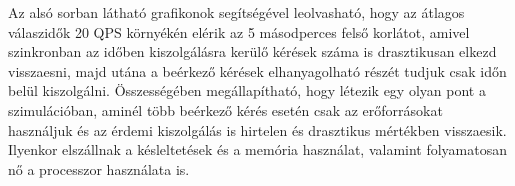 Az alsó sorban látható grafikonok segítségével leolvasható, hogy az átlagos válaszidők 20 QPS környékén elérik az 5 másodperces felső korlátot, amivel szinkronban az időben kiszolgálásra kerülő kérések száma is drasztikusan elkezd visszaesni, majd utána a beérkező kérések elhanyagolható részét tudjuk csak időn belül kiszolgálni. 
Összességében megállapítható, hogy létezik egy olyan pont a szimulációban, aminél több beérkező kérés esetén csak az erőforrásokat használjuk és az érdemi kiszolgálás is hirtelen és drasztikus mértékben visszaesik.
Ilyenkor elszállnak a késleltetések és a memória használat, valamint folyamatosan nő a processzor használata is.


